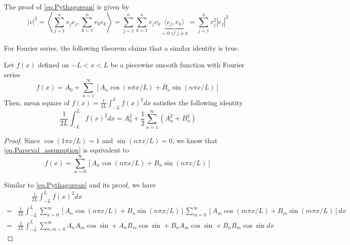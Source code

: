 The proof of \eqref{eq.Pythagorean} is given by 
\begin{equation*}
    |v|^2 = \left\langle\sum_{j = 1}^{n}v_j e_j, \sum_{k = 1}^{n}v_k e_k\right\rangle = \sum_{j = 1}^{n}\sum_{k = 1}^{n}v_jv_k\underbrace{\langle e_j, e_k\rangle}_{= 0\textit{ if }j\neq k} = \sum_{j = 1}^{n}v_j^2 |e_j|^2
\end{equation*}

For Fourier series, the following theorem claims that a similar identity is true.

\begin{theorem}
    Let $f(x)$ defined on $-L<x<L$ be a piecewise smooth function with Fourier series 
    \begin{equation}\label{eq.Parseval_assumption}
        f(x) = A_0+\sum_{n=1}^{\infty}[A_n \cos (n \pi x / L)+B_n \sin (n \pi x / L)]
    \end{equation}
    Then, mean square of $f(x)=\frac{1}{2 L} \int_{-L}^L f(x)^2 d x$ satisfies the following identity
    \begin{equation}\label{eq.Parseval_fourier}
        \frac{1}{2 L} \int_{-L}^L f(x)^2 d x=A_0^2+\frac{1}{2} \sum_{n=1}^{\infty}\left(A_n^2+B_n^2\right)
    \end{equation}
\end{theorem}
\begin{proof}
    Since $\cos (1 \pi x / L) = 1$ and $\sin (n \pi x / L) = 0$, we know that \eqref{eq.Parseval_assumption} is equivalent to 
    \begin{equation}\label{eq.proof_Parseval_0}
        f(x) = \sum_{n=0}^{\infty}[A_n \cos (n \pi x / L)+B_n \sin (n \pi x / L)]
    \end{equation}

    Similar to \eqref{eq.Pythagorean} and its proof, we have 
    \begin{equation}\label{eq.proof_Parseval_1}
        \begin{split}
            &\qquad\frac{1}{2 L} \int_{-L}^L f(x)^2 d x 
            \\
            =& \frac{1}{2 L} \int_{-L}^L \sum_{n=0}^{\infty}[A_n \cos (n \pi x / L)+B_n \sin (n \pi x / L)] \sum_{m=0}^{\infty}[A_m \cos (m \pi x / L)+B_m \sin (m \pi x / L)] d x
            \\
            =&\frac{1}{2 L} \int_{-L}^L \sum_{n,m=0}^{\infty}A_nA_m\cos\sin + A_nB_m\cos\sin + B_nA_m\cos\sin + B_nB_m\cos\sin d x
        \end{split}
    \end{equation}
\end{proof}




